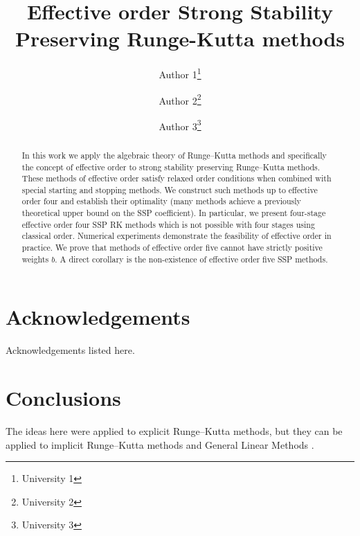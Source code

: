 \documentclass[10pt,a4paper,oneside]{article}
\title{Effective order Strong Stability Preserving Runge-Kutta methods}
\author{Author 1\footnote{University 1}
        \and
        Author 2\footnote{University 2}
        \and
        Author 3\footnote{University 3}}
\numberwithin{equation}{section}
\numberwithin{definition}{section}
\numberwithin{theorem}{section}
\numberwithin{lemma}{section}
\numberwithin{example}{section}
\numberwithin{table}{section}
\begin{document}
\maketitle


\begin{abstract}
  In this work we apply the algebraic theory of Runge--Kutta methods
  and specifically the concept of effective order to strong stability
  preserving Runge--Kutta methods.  These methods of effective order
  satisfy relaxed order conditions when combined with special starting
  and stopping methods.  We construct such methods up to effective
  order four and establish their optimality (many methods achieve a
  previously theoretical upper bound on the SSP coefficient).  In
  particular, we present four-stage effective order four SSP RK
  methods which is not possible with four stages using classical
  order.  Numerical experiments demonstrate the feasibility of
  effective order in practice.  We prove that methods of effective
  order five cannot have strictly positive weights $b$.  A direct
  corollary is the non-existence of effective order five SSP methods.
\end{abstract}




%






%
%	
%
%
%
%


\section*{Acknowledgements}
	Acknowledgements listed here.


\section{Conclusions}\label{sec:conclusions}

The ideas here were applied to explicit Runge--Kutta methods, but they
can be applied to implicit Runge--Kutta methods and General Linear
Methods \cite{Butcher2008_book}.


\appendix

%


\end{document}
